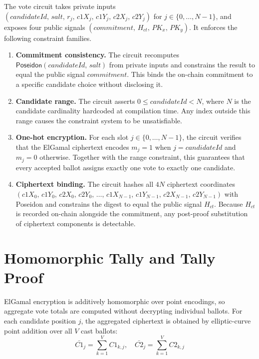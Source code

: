 The vote circuit takes private inputs $(\mathit{candidateId},\, \mathit{salt},\, r_j,\, \mathit{c1X}_j,\, \mathit{c1Y}_j,\, \mathit{c2X}_j,\, \mathit{c2Y}_j)$ for $j \in \{0,\dots,N{-}1\}$, and exposes four public signals $(\mathit{commitment},\, H_{ct},\, \mathit{PK}_x,\, \mathit{PK}_y)$. It enforces the following constraint families.
\begin{enumerate}
    \item \textbf{Commitment consistency.} The circuit recomputes $\mathsf{Poseidon}(\mathit{candidateId},\,\mathit{salt})$ from private inputs and constrains the result to equal the public signal $\mathit{commitment}$. This binds the on-chain commitment to a specific candidate choice without disclosing it.
    \item \textbf{Candidate range.} The circuit asserts $0 \le \mathit{candidateId} < N$, where $N$ is the candidate cardinality hardcoded at compilation time. Any index outside this range causes the constraint system to be unsatisfiable.
    \item \textbf{One-hot encryption.} For each slot $j \in \{0,\dots,N{-}1\}$, the circuit verifies that the ElGamal ciphertext encodes $m_j = 1$ when $j = \mathit{candidateId}$ and $m_j = 0$ otherwise. Together with the range constraint, this guarantees that every accepted ballot assigns exactly one vote to exactly one candidate.
    \item \textbf{Ciphertext binding.} The circuit hashes all $4N$ ciphertext coordinates $(\mathit{c1X}_0,\,\mathit{c1Y}_0,\,\mathit{c2X}_0,\,\mathit{c2Y}_0,\,\dots,\,\mathit{c1X}_{N-1},\,\mathit{c1Y}_{N-1},\,\mathit{c2X}_{N-1},\,\mathit{c2Y}_{N-1})$ with Poseidon and constrains the digest to equal the public signal $H_{ct}$. Because $H_{ct}$ is recorded on-chain alongside the commitment, any post-proof substitution of ciphertext components is detectable.
\end{enumerate}

\section{Homomorphic Tally and Tally Proof}

ElGamal encryption is additively homomorphic over point encodings, so aggregate vote totals are computed without decrypting individual ballots. For each candidate position $j$, the aggregated ciphertext is obtained by elliptic-curve point addition over all $V$ cast ballots:
\begin{equation}
\bar{C1}_j = \sum_{k=1}^{V} C1_{k,j}, \quad \bar{C2}_j = \sum_{k=1}^{V} C2_{k,j}
\end{equation}

